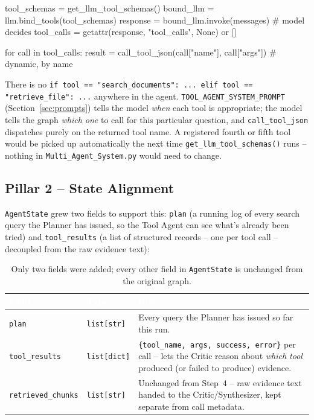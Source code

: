 \documentclass[11pt,a4paper]{article}
\begin{document}
\begin{pycode}
tool_schemas = get_llm_tool_schemas()
bound_llm = llm.bind_tools(tool_schemas)
response = bound_llm.invoke(messages)          # model decides
tool_calls = getattr(response, "tool_calls", None) or []

for call in tool_calls:
    result = call_tool_json(call["name"], call["args"])   # dynamic, by name
\end{pycode}

There is no \texttt{if tool == "search\_documents": ... elif tool ==
"retrieve\_file": ...} anywhere in the agent. \texttt{TOOL\_AGENT\_SYSTEM\_PROMPT}
(Section~\ref{sec:prompts}) tells the model \emph{when} each tool is
appropriate; the model tells the graph \emph{which one} to call for this
particular question, and \texttt{call\_tool\_json} dispatches purely on
the returned tool name. A registered fourth or fifth tool would be picked
up automatically the next time \texttt{get\_llm\_tool\_schemas()} runs --
nothing in \texttt{Multi\_Agent\_System.py} would need to change.

\subsection{Pillar 2 -- State Alignment}

\texttt{AgentState} grew two fields to support this: \texttt{plan} (a
running log of every search query the Planner has issued, so the Tool
Agent can see what's already been tried) and \texttt{tool\_results} (a
list of structured records -- one per tool call -- decoupled from the raw
evidence text):

\begin{table}[H]
\centering
\small
\begin{tabularx}{\textwidth}{@{}l l X@{}}
\toprule
\rowcolor{navylight}
\textcolor{white}{\textbf{Field}} & \textcolor{white}{\textbf{Type}} & \textcolor{white}{\textbf{Role}} \\
\midrule
\texttt{plan} & \texttt{list[str]} & Every query the Planner has issued so far this run. \\
\texttt{tool\_results} & \texttt{list[dict]} & \texttt{\{tool\_name, args, success, error\}} per call -- lets the Critic reason about \emph{which tool} produced (or failed to produce) evidence. \\
\texttt{retrieved\_chunks} & \texttt{list[str]} & Unchanged from Step~4 -- raw evidence text handed to the Critic/Synthesizer, kept separate from call metadata. \\
\bottomrule
\end{tabularx}
\caption{Only two fields were added; every other field in \texttt{AgentState} is unchanged from the original graph.}
\end{table}
\end{document}
